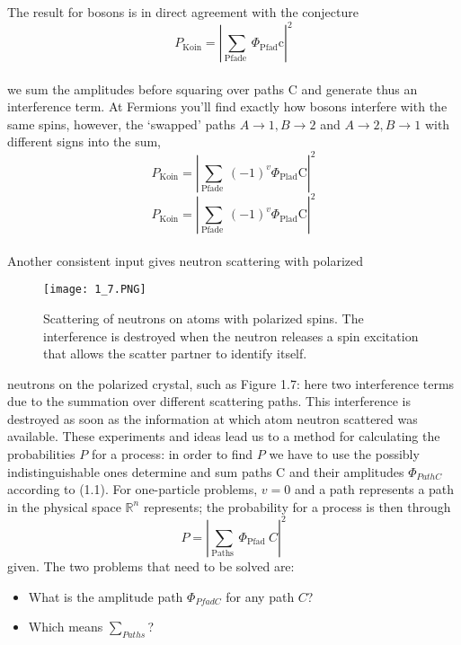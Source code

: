 The result for bosons is in direct agreement with the conjecture
\\
$$
P_{\mathrm{Koin}}=\left|\sum_{\text {Pfade }} \Phi_{\mathrm{Pfad}} \mathrm{c}\right|^{2}
$$\\
we sum the amplitudes before squaring over paths C and generate thus an interference term. At Fermions you'll find exactly how bosons interfere with the same spins, however, the `swapped' paths $A\to 1, B\to 2$ and $A\to 2, B\to 1$ with different signs
into the sum,
\\
$$
P_{\mathrm{Koin}}=\left|\sum_{\text {Pfade }}(-1)^{v} \Phi_{\mathrm{Plad}} \mathrm{C}\right|^{2}
$$
$$
P_{\mathrm{Koin}}=\left|\sum_{\text {Pfade }}(-1)^{v} \Phi_{\mathrm{Plad}} \mathrm{C}\right|^{2}
$$\\
Another consistent input gives neutron scattering with polarized
\begin{figure}[ht]
    \centering
    \texttt{[image: 1\_7.PNG]}
    \caption{Scattering of neutrons on atoms with polarized spins. The interference is destroyed when the neutron releases a spin excitation that allows the scatter partner to identify itself.}
    \label{fig:1.7}
\end{figure}
neutrons on the polarized crystal, such as Figure 1.7: here two interference terms due to the summation over different scattering paths.
This interference is destroyed as soon as the information at which atom
neutron scattered was available. These experiments and ideas
lead us to a method for calculating the probabilities $P$
for a process: in order to find $P$ we have to use the possibly indistinguishable ones
determine and sum paths C and their amplitudes $\Phi_{PathC}$
according to (1.1).
For one-particle problems, $ v = 0$ and a path represents a path in the
physical space $\mathbb{R}^n$ represents; the probability for a process is
then through
\\
\begin{equation}
P=\left|\sum_{\text {Paths }} \Phi_{\text {Pfad }} C\right|^{2}
\end{equation}
given. The two problems that need to be solved are:
\begin{itemize}
    \item What is the amplitude path $\Phi_{Pfad C}$ for any path $C$?
    \item Which means $\sum_{Paths}$?
\end{itemize}

